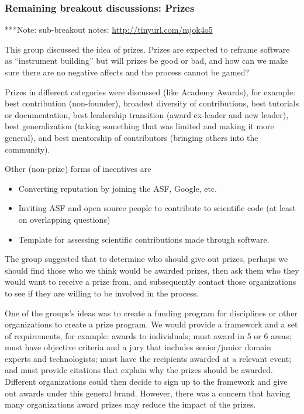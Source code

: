 \documentclass[11pt, oneside]{amsart}
\newcommand{\note}[1]{ {\textcolor{blueish}    { ***Note:      #1 }}}
\begin{document}
\subsubsection{Remaining breakout discussions: Prizes}\label{sec:prizes}
\note{sub-breakout notes: \url{http://tinyurl.com/mjok4o5}}

This group discussed the idea of prizes. Prizes are expected to reframe software
as ``instrument building'' but will prizes be good or bad, and how can we make
sure there are no negative affects and the process cannot be gamed?

Prizes in different categories were discussed (like Academy Awards), for
example: best contribution (non-founder), broadest diversity of contributions,
best tutorials or documentation, best leadership transition (award ex-leader and
new leader), best generalization (taking something that was limited and making
it more general), and best mentorship of contributors (bringing others into the
community).

Other (non-prize) forms of incentives are
\begin{itemize}
\item Converting reputation by joining the ASF, Google, etc.
\item Inviting ASF and open source people to contribute to scientific code (at
least on overlapping questions)
\item Template for assessing scientific contributions made through software.
\end{itemize}

The group suggested that to determine who should give out prizes, perhaps we
should find those who we think would be awarded prizes, then ask them who they
would want to receive a prize from, and subsequently contact those organizations to see if they
are willing to be involved in the process.

One of the groups's ideas was to create a funding program for disciplines or
other organizations to create a prize program. We would provide a framework and
a set of requirements, for example: awards to individuals; must award in 5 or 6
areas; must have objective criteria and a jury that includes senior/junior
domain experts and technologists; must have the recipients awarded at a
relevant event; and must provide citations that explain why the prizes should be
awarded. Different organizations could then decide to sign up to the framework
and give out awards under this general brand. However, there was a concern that
having many organizations award prizes may reduce the impact of the prizes.
\end{document}
